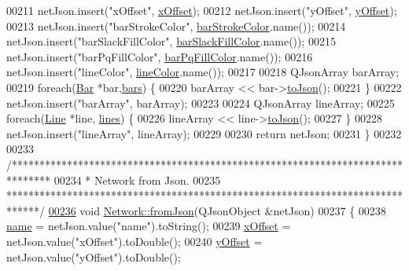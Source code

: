 \begin{DoxyCode}
00211   netJson.insert(\textcolor{stringliteral}{"xOffset"}, \hyperlink{class_network_a9f5c70be28a45320802bd0ac3947d114}{xOffset});
00212   netJson.insert(\textcolor{stringliteral}{"yOffset"}, \hyperlink{class_network_a771b16f7eb4459d0ca7141c048b1ab59}{yOffset});
00213   netJson.insert(\textcolor{stringliteral}{"barStrokeColor"}, \hyperlink{class_network_ad69052271ab0a9899948815b6201f2c6}{barStrokeColor}.name());
00214   netJson.insert(\textcolor{stringliteral}{"barSlackFillColor"}, \hyperlink{class_network_ad78d9a206daf4ba0780067b5043c7f5c}{barSlackFillColor}.name());
00215   netJson.insert(\textcolor{stringliteral}{"barPqFillColor"}, \hyperlink{class_network_a386f492f548ec13f5d0e350c4f2217aa}{barPqFillColor}.name());
00216   netJson.insert(\textcolor{stringliteral}{"lineColor"}, \hyperlink{class_network_a453db7f1a994603fe4d38ac5899eb09c}{lineColor}.name());
00217 
00218   QJsonArray barArray;
00219   \textcolor{keywordflow}{foreach}(\hyperlink{class_bar}{Bar} *bar,\hyperlink{class_network_a7fe628f7de34a96235cbd3f2cee4aff2}{bars}) \{
00220     barArray << bar->\hyperlink{group___models_ga3eb84c42b687db6cd98e11b8bd38c86e}{toJson}();
00221   \}
00222   netJson.insert(\textcolor{stringliteral}{"barArray"}, barArray);
00223 
00224   QJsonArray lineArray;
00225   \textcolor{keywordflow}{foreach}(\hyperlink{class_line}{Line} *line, \hyperlink{class_network_acda0fd42e712e460a08a0e96511ee7eb}{lines}) \{
00226     lineArray << line->\hyperlink{group___models_ga4effa7a96db465ea6e01135d5a010739}{toJson}();
00227   \}
00228   netJson.insert(\textcolor{stringliteral}{"lineArray"}, lineArray);
00229 
00230   \textcolor{keywordflow}{return} netJson;
00231 \}
00232 
00233 \textcolor{comment}{/*******************************************************************************}
00234 \textcolor{comment}{ *  Network from Json.}
00235 \textcolor{comment}{ ******************************************************************************/}
\hypertarget{network_8cpp_source_l00236}{}\hyperlink{group___graphics_ga2aef0f6c0d9569ec4d6b948d1ef0d5f1}{00236} \textcolor{keywordtype}{void} \hyperlink{group___graphics_ga2aef0f6c0d9569ec4d6b948d1ef0d5f1}{Network::fromJson}(QJsonObject &netJson)
00237 \{
00238   \hyperlink{class_network_ab6643733a517f930c60b06f5ffd78186}{name} = netJson.value(\textcolor{stringliteral}{"name"}).toString();
00239   \hyperlink{class_network_a9f5c70be28a45320802bd0ac3947d114}{xOffset} = netJson.value(\textcolor{stringliteral}{"xOffset"}).toDouble();
00240   \hyperlink{class_network_a771b16f7eb4459d0ca7141c048b1ab59}{yOffset} = netJson.value(\textcolor{stringliteral}{"yOffset"}).toDouble();

\end{DoxyCode}
